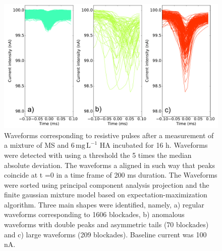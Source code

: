 \documentclass[journal=langd5,manuscript=article]{achemso}
\begin{document}
 \begin{figure}
  \includegraphics[width=\linewidth]{Figures/Block_sorting_HA6_T16.pdf}
  \caption{Waveforms corresponding to resistive pulses  after a measurement of a mixture of MS and $\mathrm{6\, mg\, L^{-1}}$ HA incubated for 16 h. Waveforms were detected with using a threshold the 5 times the median absolute deviation. The waveforms a aligned in such way that peaks coincide at t =0 in a time frame  of 200 ms duration. The Waveforms were sorted using principal component analysis projection  and the finite gaussian mixture model based on expectation-maximization algorithm. Three main shapes were identified, namely,  a) regular waveforms corresponding to 1606 blockades, b) anomalous waveforms with double peaks and asymmetric tails (70 blockades) and c) large waveforms (209 blockades). Baseline current was 100 nA.}
\label{fgr:block_sorting_HA6_T16}
\end{figure}
\end{document}
